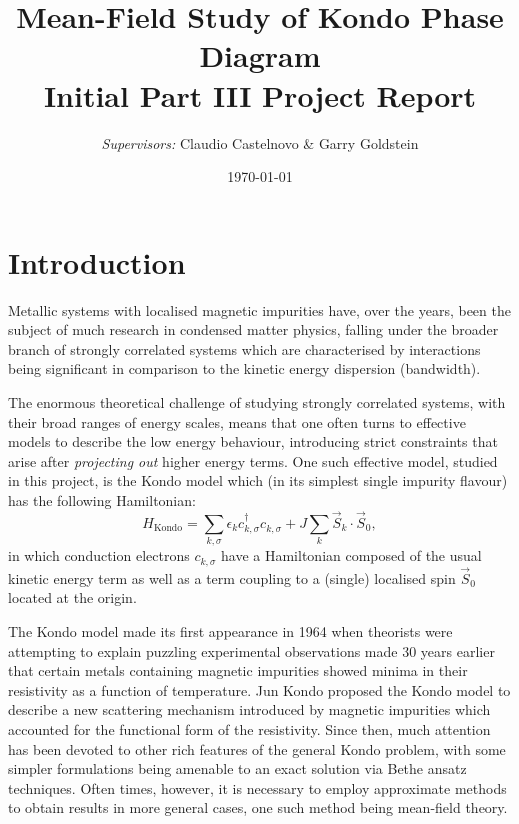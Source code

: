 \documentclass[12pt]{article}
\begin{document}


\title{
  Mean-Field Study of Kondo Phase Diagram \\
  \large Initial Part III Project Report
}
\author{\textit{Supervisors:} Claudio Castelnovo \& Garry Goldstein}
\date{\today}

\maketitle

\section{Introduction}

Metallic systems with localised magnetic impurities have, over the years, been the subject of much research in condensed matter physics, falling under the broader branch of strongly correlated systems which are characterised by interactions being significant in comparison to the kinetic energy dispersion (bandwidth).

The enormous theoretical challenge of studying strongly correlated systems, with their broad ranges of energy scales, means that one often turns to effective models to describe the low energy behaviour, introducing strict constraints that arise after \textit{projecting out} higher energy terms. One such effective model, studied in this project, is the Kondo model which (in its simplest single impurity flavour) has the following Hamiltonian: \begin{equation} H_{\text{Kondo}}=\sum_{k,\sigma}\epsilon_{k} c_{k,\sigma}^{\dagger}c^{}_{k,\sigma}+J\sum_{k}\vec{S}_{k}\cdot\vec{S}_{0} , \label{eq:KondoHamiltonian}\end{equation} in which conduction electrons $ c_{k,\sigma} $ have a Hamiltonian composed of the usual kinetic energy term as well as a term coupling to a (single) localised spin $ \vec{S}_{0} $ located at the origin.

The Kondo model made its first appearance in 1964 when theorists were attempting to explain puzzling experimental observations made 30 years earlier that certain metals containing magnetic impurities showed minima in their resistivity as a function of temperature. Jun Kondo proposed the Kondo model to describe a new scattering mechanism introduced by magnetic impurities which accounted for the functional form of the resistivity. Since then, much attention has been devoted to other rich features of the general Kondo problem, with some simpler formulations being amenable to an exact solution via Bethe ansatz techniques. Often times, however, it is necessary to employ approximate methods to obtain results in more general cases, one such method being mean-field theory.
\end{document}
